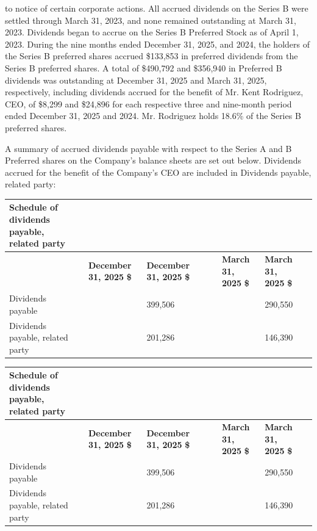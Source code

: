 \documentclass[11pt,a4paper]{article}
\begin{document}
to notice of certain corporate actions. All accrued dividends on the Series B were settled through March 31, 2023, and none remained outstanding at March 31, 2023. Dividends began to accrue on the Series B Preferred Stock as of April 1, 2023. During the nine months ended December 31, 2025, and 2024, the holders of the Series B preferred shares accrued \$133,853 in preferred dividends from the Series B preferred shares. A total of \$490,792 and \$356,940 in Preferred B dividends was outstanding at December 31, 2025 and March 31, 2025, respectively, including dividends accrued for the benefit of Mr. Kent Rodriguez, CEO, of \$8,299 and \$24,896 for each respective three and nine-month period ended December 31, 2025 and 2024. Mr. Rodriguez holds 18.6\% of the Series B preferred shares.

A summary of accrued dividends payable with respect to the Series A and B Preferred shares on the Company's balance sheets are set out below. Dividends accrued for the benefit of the Company's CEO are included in Dividends payable, related party:

\begin{table}[h]
\begin{tabular}{|l|l|l|l|l|l|l|l|l|}
\hline
Schedule of dividends payable, related party &  &  &  &  &  &  &  &  \\ \hline
 &  & \textbf{December 31, 2025}  \textbf{\$} & \textbf{December 31, 2025}  \textbf{\$} &  &  & \textbf{March 31, 2025}  \textbf{\$} & \textbf{March 31, 2025}  \textbf{\$} &  \\ \hline
Dividends payable &  &  & 399,506 &  &  &  & 290,550 &  \\ \hline
Dividends payable, related party &  &  & 201,286 &  &  &  & 146,390 &  \\ \hline
\end{tabular}
\end{table}

\begin{table}[h]
\begin{tabular}{|l|l|l|l|l|l|l|l|l|}
\hline
Schedule of dividends payable, related party &  &  &  &  &  &  &  &  \\ \hline
 &  & \textbf{December 31, 2025}  \textbf{\$} & \textbf{December 31, 2025}  \textbf{\$} &  &  & \textbf{March 31, 2025}  \textbf{\$} & \textbf{March 31, 2025}  \textbf{\$} &  \\ \hline
Dividends payable &  &  & 399,506 &  &  &  & 290,550 &  \\ \hline
Dividends payable, related party &  &  & 201,286 &  &  &  & 146,390 &  \\ \hline
\end{tabular}
\end{table}
\end{document}
